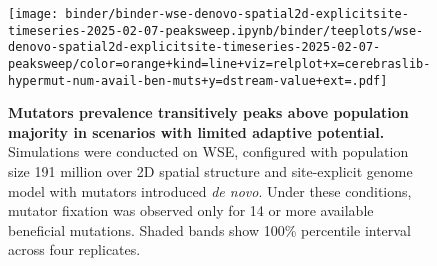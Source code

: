 \begin{figure}

\begin{minipage}{0.4\textwidth}
\texttt{[image: binder/binder-wse-denovo-spatial2d-explicitsite-timeseries-2025-02-07-peaksweep.ipynb/binder/teeplots/wse-denovo-spatial2d-explicitsite-timeseries-2025-02-07-peaksweep/color=orange+kind=line+viz=relplot+x=cerebraslib-hypermut-num-avail-ben-muts+y=dstream-value+ext=.pdf]}
\end{minipage}
\begin{minipage}{0.55\textwidth}
\caption{
\textbf{Mutators prevalence transitively peaks above population majority in scenarios with limited adaptive potential.}
\footnotesize
Simulations were conducted on WSE, configured with population size 191 million over 2D spatial structure and site-explicit genome model with mutators introduced \textit{de novo}.
Under these conditions, mutator fixation was observed only for 14 or more available beneficial mutations.
Shaded bands show 100\% percentile interval across four replicates.
}
\label{fig:peaksweep}
\end{minipage}
\end{figure}
